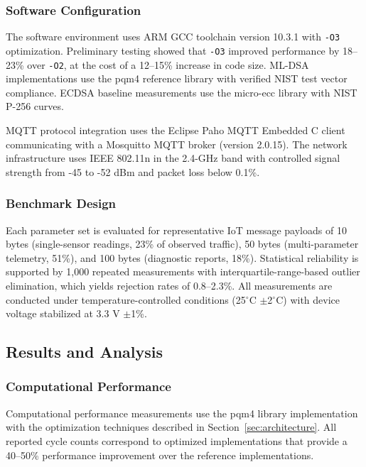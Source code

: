\documentclass[final, twoside]{IEEEtran} %
\begin{document}
\subsubsection{Software Configuration}

The software environment uses ARM GCC toolchain version 10.3.1 with \texttt{-O3} optimization. Preliminary testing showed that \texttt{-O3} improved performance by 18--23\% over \texttt{-O2}, at the cost of a 12--15\% increase in code size. ML-DSA implementations use the pqm4 reference library with verified NIST test vector compliance. ECDSA baseline measurements use the micro-ecc library with NIST P-256 curves.

MQTT protocol integration uses the Eclipse Paho MQTT Embedded C client communicating with a Mosquitto MQTT broker (version 2.0.15). The network infrastructure uses IEEE 802.11n in the 2.4-GHz band with controlled signal strength from -45 to -52 dBm and packet loss below 0.1\%.

\subsubsection{Benchmark Design}

Each parameter set is evaluated for representative IoT message payloads of 10 bytes (single-sensor readings, 23\% of observed traffic), 50 bytes (multi-parameter telemetry, 51\%), and 100 bytes (diagnostic reports, 18\%). Statistical reliability is supported by 1,000 repeated measurements with interquartile-range-based outlier elimination, which yields rejection rates of 0.8--2.3\%. All measurements are conducted under temperature-controlled conditions (25$^\circ$C $\pm$2$^\circ$C) with device voltage stabilized at 3.3 V $\pm$1\%.

\subsection{Results and Analysis}\label{sec:results}

\subsubsection{Computational Performance}

Computational performance measurements use the pqm4 library implementation with the optimization techniques described in Section~\ref{sec:architecture}. All reported cycle counts correspond to optimized implementations that provide a 40--50\% performance improvement over the reference implementations.
\end{document}
